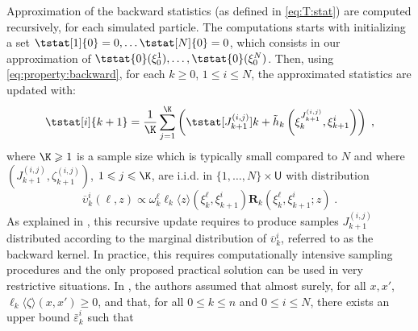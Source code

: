 \documentclass{article}
\newcommand{\af}[1]{h_{#1}}
\newcommand{\addf}[1]{\termletter_{#1}}
\newcommand{\termletter}{\tilde{h}}
\newcommand{\N}{N}
\newcommand{\hkup}{\bar{\varepsilon}}
\newcommand{\bi}[3]{J_{#1}^{(#2, #3)}}
\newcommand{\eqsp}{\;}
\newcommand{\ewght}[2]{\ensuremath{\omega_{#1}^{#2}}}
\newcommand{\epart}[2]{\ensuremath{\xi_{#1}^{#2}}}
\newcommand{\marginalset}{\mathsf{U}}
\newcommand{\kernelmarg}{\mathbf{R}}
\newcommand{\hatqg}[1]{\mathsf{\ell}_{#1}}
\begin{document}
Approximation of the backward statistics (as defined in \eqref{eq:T:stat}) are computed recursively, for each simulated particle. 
The computations starts with initializing a set $\tstat[1]{0} = 0,\dots \tstat[N]{0} = 0$, which consists in our approximation of $\tstat{0}(\epart{0}{1}), \dots, \tstat{0}(\epart{0}{N})$.  Then, using \eqref{eq:property:backward}, for each $k\geqslant 0$, $1\leqslant i\leqslant \N$, the approximated statistics are updated with:
\begin{equation}
\label{eq:update:paris:marginal}
\tstat[i]{k+1}  = \frac{1}{\K} \sum_{j=1}^{\K} \left( \tstat[\bi{k+1}{i}{j}]{k} + \addf{k}\left(\epart{k}{\bi{k+1}{i}{j}}, \epart{k+1}{i}\right)\right)\eqsp,
\end{equation}
where $\K\geqslant 1$ is a sample size which  is typically small compared to $\N$ and where $(\bi{k+1}{i}{j},\zeta_{k+1}^{(i,j)})$, $1\leqslant j\leqslant \K$, are i.i.d. in $\{1,\ldots,\N\}\times\marginalset$ with distribution 
$$
\overline \upsilon_k^i(\ell,z)\propto\ewght{k}{\ell}\hatqg{k}\langle z\rangle(\epart{k}{\ell},\epart{k+1}{i})\kernelmarg_{k}(\epart{k}{\ell},\epart{k+1}{i};z)\eqsp.
$$
As explained in \cite{gloaguen2021pseudo}, this recursive update requires to produce samples $\bi{k+1}{i}{j}$ distributed according to the marginal  distribution of $\overline \upsilon_k^i$, referred to as the backward kernel. In practice, this requires computationally intensive sampling procedures and the only proposed practical solution can be used in very restrictive situations.  
In \cite{gloaguen2018online}, the authors assumed that  almost surely, for all $x,x'$, $\hatqg{k}\langle \zeta\rangle(x, x')\geqslant 0$, and that, for all  $0\leqslant k\leqslant n$ and $0\leqslant i\leqslant N$, there exists an upper bound $\hkup^i_k$  such that
\end{document}
